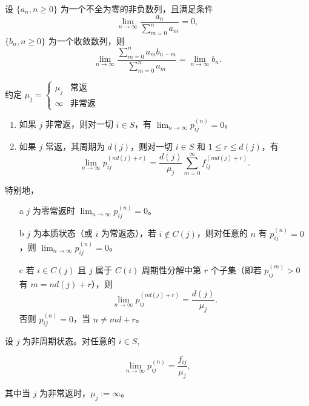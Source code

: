 \documentclass[lang=cn,10pt,thmcnt=section]{elegantbook}
\begin{document}
\begin{lemma}
	设 \(\{a_n, n \geq 0\}\) 为一个不全为零的非负数列，且满足条件
\[
\lim_{n \to \infty} \frac{a_n}{\sum_{m=0}^n a_m} = 0,
\]
\(\{b_n, n \geq 0\}\) 为一个收敛数列，则
\[
\lim_{n \to \infty} \frac{\sum_{m=0}^n a_m b_{n-m}}{\sum_{m=0}^n a_m} = \lim_{n \to \infty} b_n.
\]
\end{lemma}

约定 \(\mu_j = \begin{cases} 
	\mu_j & \text{常返} \\
	\infty & \text{非常返}
	\end{cases}\)

\begin{theorem}\label{6.30}



		\begin{enumerate}
			\item 如果 \(j\) 非常返，则对一切 \(i \in S\)，有 \(\lim_{n \to \infty} p_{ij}^{(n)} = 0\)。
			\item 如果 \(j\) 常返，其周期为 \(d(j)\)，则对一切 \(i \in S\) 和 \(1 \leq r \leq d(j)\)，有
			\[
			\lim_{n \to \infty} p_{ij}^{(nd(j)+r)} = \frac{d(j)}{\mu_j} \sum_{m=0}^{\infty} f_{ij}^{(md(j)+r)}.
			\]
		\end{enumerate}
		
		特别地，
		
		\begin{enumerate}
			\item[a] \(j\) 为零常返时 \(\lim_{n \to \infty} p_{ij}^{(n)} = 0\)。
			\item[b]	 \(j\) 为本质状态（或 \(i\) 为常返态），若 \(i \notin C(j)\)，则对任意的 \(n\) 有 \(p_{ij}^{(n)} = 0\)，则 \(\lim_{n \to \infty} p_{ij}^{(n)} = 0\)。
			\item[c] 若 \(i \in C(j)\) 且 \(j\) 属于 \(C(i)\) 周期性分解中第 \(r\) 个子集（即若 \(p_{ij}^{(m)} > 0\) 有 \(m = nd(j) + r\)），则
		\[
		\lim_{n \to \infty} p_{ij}^{(nd(j)+r)} = \frac{d(j)}{\mu_j}.
		\]
		否则 \(p_{ij}^{(n)} = 0\)，当 \(n \neq md + r\)。
		\end{enumerate}
\end{theorem}
\begin{corollary}
	设 \( j \) 为非周期状态。对任意的 \( i \in S \),

\[
\lim_{n \to \infty} p_{ij}^{(n)} = \frac{f_{ij}}{\mu_j},
\]

其中当 \( j \) 为非常返时，\( \mu_j := \infty \)。
\end{corollary}
\end{document}
